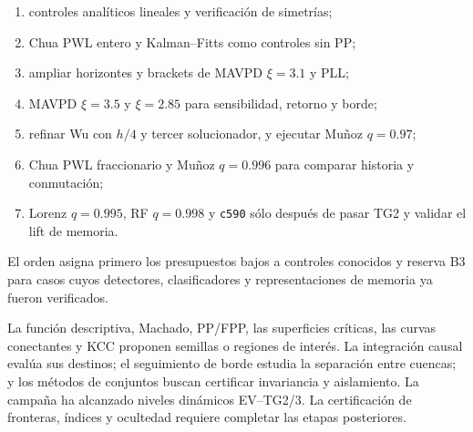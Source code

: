 \begin{enumerate}
  \item controles analíticos lineales y verificación de simetrías;
  \item Chua PWL entero y Kalman--Fitts como controles sin PP;
  \item ampliar horizontes y brackets de MAVPD $\xi=3.1$ y PLL;
  \item MAVPD \(\xi=3.5\) y \(\xi=2.85\) para sensibilidad, retorno y borde;
  \item refinar Wu con $h/4$ y tercer solucionador, y ejecutar Muñoz \(q=0.97\);
  \item Chua PWL fraccionario y Muñoz \(q=0.996\) para comparar historia y
        conmutación;
  \item Lorenz \(q=0.995\), RF \(q=0.998\) y \texttt{c590} sólo después de pasar
        TG2 y validar el lift de memoria.
\end{enumerate}

El orden asigna primero los presupuestos bajos a controles conocidos y reserva
B3 para casos cuyos detectores, clasificadores y representaciones de memoria
ya fueron verificados.


\begin{proposalbox}
La función descriptiva, Machado, PP/FPP, las superficies críticas, las curvas
conectantes y KCC proponen semillas o regiones de interés. La integración
causal evalúa sus destinos; el seguimiento de borde estudia la separación
entre cuencas; y los métodos de conjuntos buscan certificar invariancia y
aislamiento. La campaña ha alcanzado niveles dinámicos EV--TG2/3. La
certificación de fronteras, índices y ocultedad requiere completar las
etapas posteriores.
\end{proposalbox}
